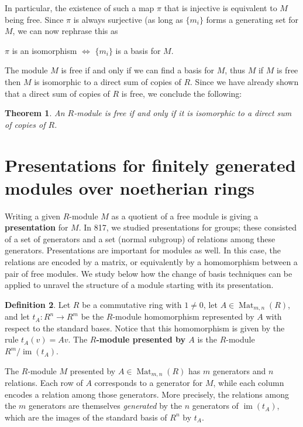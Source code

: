 \documentclass[12pt]{report}
\newtheorem{theorem}{Theorem}[chapter]
\numberwithin{equation}{section}
\numberwithin{theorem}{chapter}
\theoremstyle{definition}
\newtheorem{definition}[theorem]{Definition}
\newtheorem*{basic properties}{Basic Properties}
\newtheorem*{Important Remark}{Important Remark}
\newcommand{\df}[1]{{\bf #1}\index{#1}}
\DeclareMathOperator{\im}{im}
\DeclareMathOperator{\M}{Mat}
\begin{document}
In particular, the existence of such a map $\pi$ that is injective is equivalent to $M$ being free. Since $\pi$ is always surjective (as long as $\{ m_i \}$ forms a generating set for $M$, we can now rephrase this as
\begin{center}
	$\pi$ is an isomorphism $\iff$ $\{ m_i \}$ is a basis for $M$.
\end{center}

The module $M$ is free if and only if we can find a basis for $M$, thus $M$ if $M$ is free then $M$ is isomorphic to a direct sum of copies of $R$. Since we have already shown that a direct sum of copies of $R$ is free, we conclude the following:

\begin{theorem}
	An $R$-module is free if and only if it is isomorphic to a direct sum of copies of $R$.
\end{theorem}




\section{Presentations for finitely generated modules over noetherian rings}

Writing a given $R$-module $M$ as a quotient of a free module is giving a {\bf presentation} for $M$.
In 817, we studied presentations for groups; these consisted of a set of generators and a set (normal subgroup) of relations among these generators. Presentations are important for modules as well. In this case, the relations are encoded by a matrix, or equivalently by a homomorphism between a pair of free modules. We study below how the change of basis techniques can be applied to unravel the structure of a module starting with its presentation.


  
\begin{definition} 
Let $R$ be a commutative ring with $1 \neq 0$, let $A \in \M_{m,n}(R)$, and let $t_A\!: R^n \to R^m$ be the $R$-module homomorphism represented by $A$ with respect to the standard bases. Notice that this homomorphism is given by the rule $t_A(v)=Av$. The \df{$R$-module presented by $A$} is the $R$-module $R^m/\im(t_A)$.
 \end{definition}
 
 
The $R$-module $M$ presented by $A \in \M_{m,n}(R)$ has $m$ generators and $n$ relations. Each row of $A$ corresponds to a generator for $M$, while each column encodes a relation among those generators. More precisely, the relations among the $m$ generators are themselves \emph{generated} by the $n$ generators of $\im(t_A)$, which are the images of the standard basis of $R^n$ by $t_A$.
 
\end{document}
